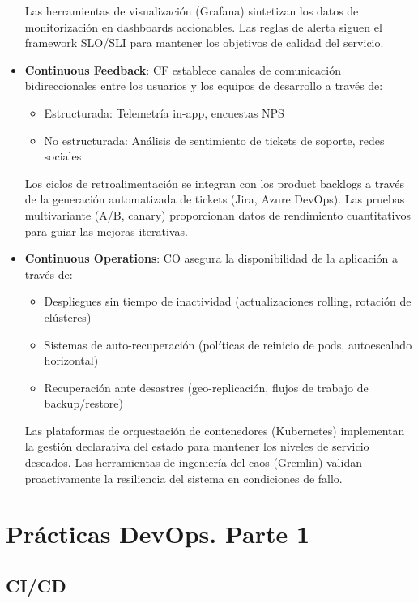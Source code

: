\documentclass[12pt]{book}
\begin{document}
\begin{itemize}
    Las herramientas de visualización (Grafana) sintetizan los datos de monitorización en dashboards accionables. Las reglas de alerta siguen el framework SLO/SLI para mantener los objetivos de calidad del servicio.

    \item \textbf{Continuous Feedback}:
    CF establece canales de comunicación bidireccionales entre los usuarios y los equipos de desarrollo a través de:
    \begin{itemize}
        \item Estructurada: Telemetría in-app, encuestas NPS
        \item No estructurada: Análisis de sentimiento de tickets de soporte, redes sociales
    \end{itemize}

    Los ciclos de retroalimentación se integran con los product backlogs a través de la generación automatizada de tickets (Jira, Azure DevOps). Las pruebas multivariante (A/B, canary) proporcionan datos de rendimiento cuantitativos para guiar las mejoras iterativas.

    \item \textbf{Continuous Operations}:
    CO asegura la disponibilidad de la aplicación a través de:
    \begin{itemize}
        \item Despliegues sin tiempo de inactividad (actualizaciones rolling, rotación de clústeres)
        \item Sistemas de auto-recuperación (políticas de reinicio de pods, autoescalado horizontal)
        \item Recuperación ante desastres (geo-replicación, flujos de trabajo de backup/restore)
    \end{itemize}

    Las plataformas de orquestación de contenedores (Kubernetes) implementan la gestión declarativa del estado para mantener los niveles de servicio deseados. Las herramientas de ingeniería del caos (Gremlin) validan proactivamente la resiliencia del sistema en condiciones de fallo.
\end{itemize}


\section{Prácticas DevOps. Parte 1}
\subsection{CI/CD}
\end{document}
